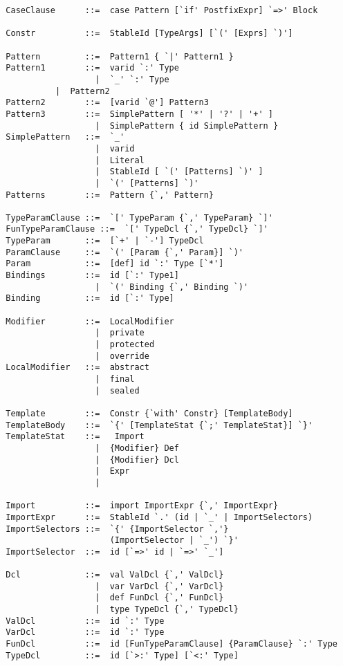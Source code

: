 \documentclass[a4paper,12pt,twoside,titlepage]{book}
\begin{document}
\begin{lstlisting}
  CaseClause      ::=  case Pattern [`if' PostfixExpr] `=>' Block 

  Constr          ::=  StableId [TypeArgs] [`(' [Exprs] `)']  

  Pattern         ::=  Pattern1 { `|' Pattern1 }
  Pattern1        ::=  varid `:' Type
                    |  `_' `:' Type
		    |  Pattern2
  Pattern2        ::=  [varid `@'] Pattern3
  Pattern3        ::=  SimplePattern [ '*' | '?' | '+' ]
                    |  SimplePattern { id SimplePattern }
  SimplePattern   ::=  `_'
                    |  varid
                    |  Literal
                    |  StableId [ `(' [Patterns] `)' ]
                    |  `(' [Patterns] `)'
  Patterns        ::=  Pattern {`,' Pattern}

  TypeParamClause ::=  `[' TypeParam {`,' TypeParam} `]'
  FunTypeParamClause ::=  `[' TypeDcl {`,' TypeDcl} `]'
  TypeParam       ::=  [`+' | `-'] TypeDcl
  ParamClause     ::=  `(' [Param {`,' Param}] `)'
  Param           ::=  [def] id `:' Type [`*']
  Bindings        ::=  id [`:' Type1]
                    |  `(' Binding {`,' Binding `)'
  Binding         ::=  id [`:' Type]

  Modifier        ::=  LocalModifier
                    |  private
                    |  protected
                    |  override 
  LocalModifier   ::=  abstract
                    |  final
                    |  sealed

  Template        ::=  Constr {`with' Constr} [TemplateBody]
  TemplateBody    ::=  `{' [TemplateStat {`;' TemplateStat}] `}'
  TemplateStat    ::=   Import
                    |  {Modifier} Def
                    |  {Modifier} Dcl
                    |  Expr
                    |

  Import          ::=  import ImportExpr {`,' ImportExpr}
  ImportExpr      ::=  StableId `.' (id | `_' | ImportSelectors)
  ImportSelectors ::=  `{' {ImportSelector `,'} 
                       (ImportSelector | `_') `}'
  ImportSelector  ::=  id [`=>' id | `=>' `_']

  Dcl             ::=  val ValDcl {`,' ValDcl}
                    |  var VarDcl {`,' VarDcl}
                    |  def FunDcl {`,' FunDcl}
                    |  type TypeDcl {`,' TypeDcl}
  ValDcl          ::=  id `:' Type
  VarDcl          ::=  id `:' Type
  FunDcl          ::=  id [FunTypeParamClause] {ParamClause} `:' Type
  TypeDcl         ::=  id [`>:' Type] [`<:' Type]


\end{lstlisting}
\end{document}

